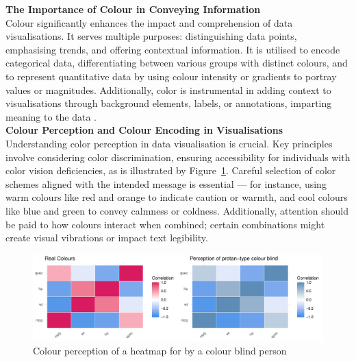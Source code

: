 \documentclass{article}\usepackage[]{graphicx}\usepackage[]{xcolor}
\makeatletter
\def\maxwidth{ %
  \ifdim\Gin@nat@width>\linewidth
    \linewidth
  \else
    \Gin@nat@width
  \fi
}
\newenvironment{knitrout}{}{} %
\numberwithin{equation}{section}
\makeatother
\begin{document}
\noindent \textbf{The Importance of Colour in Conveying Information}\\
Colour significantly enhances the impact and comprehension of data visualisations. It serves multiple purposes: distinguishing data points, emphasising trends, and offering contextual information. It is utilised to encode categorical data, differentiating between various groups with distinct colours, and to represent quantitative data by using colour intensity or gradients to portray values or magnitudes. Additionally, color is instrumental in adding context to visualisations through background elements, labels, or annotations, imparting meaning to the data \cite{healy2018data}.\\

\noindent \textbf{Colour Perception and Colour Encoding in Visualisations}\\
Understanding color perception in data visualisation is crucial. Key principles involve considering color discrimination, ensuring accessibility for individuals with color vision deficiencies, as is illustrated by Figure~\ref{fig:colour-plot}. Careful selection of color schemes aligned with the intended message is essential — for instance, using warm colours like red and orange to indicate caution or warmth, and cool colours like blue and green to convey calmness or coldness. Additionally, attention should be paid to how colours interact when combined; certain combinations might create visual vibrations or impact text legibility.\\

\begin{knitrout}\scriptsize
{}\color{fgcolor}\begin{figure}[H]

{\centering \includegraphics[width=\maxwidth]{figure/beamer-colour-plot-1} 

}

\caption[Colour perception of a heatmap for by a colour blind person]{Colour perception of a heatmap for by a colour blind person}\label{fig:colour-plot}
\end{figure}

\end{knitrout}
\end{document}
